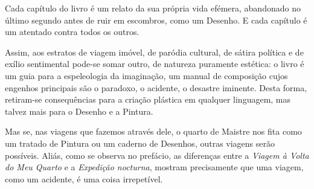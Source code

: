 \documentclass[12pt]{article}
\begin{document}
Cada capítulo do livro é um relato da sua própria vida efémera,
abandonado no último segundo antes de ruir em escombros, como um
Desenho. E cada capítulo é um atentado contra todos os outros.

Assim, aos estratos de viagem imóvel, de paródia cultural, de sátira
política e de exílio sentimental pode-se somar outro, de natureza
puramente estética: o livro é um guia para a espeleologia da
imaginação, um manual de composição cujos engenhos principais são o
paradoxo, o acidente, o desastre iminente. Desta forma, retiram-se
consequências para a criação plástica em qualquer linguagem, mas
talvez mais para o Desenho e a Pintura.

Mas se, nas viagens que fazemos através dele, o quarto de Maistre nos
fita como um tratado de Pintura ou um caderno de Desenhos, outras
viagens serão possíveis. Aliás, como se observa no prefácio, as
diferenças entre a \emph{Viagem à Volta do Meu Quarto} e a
\emph{Expedição nocturna}, mostram precisamente que uma viagem, como
um acidente, é uma coisa irrepetível.

\renewcommand*{\bibfont}{\footnotesize}

\printbibliography[heading=bibliography,title={\hspace{1cm}Referências}]
\end{document}
